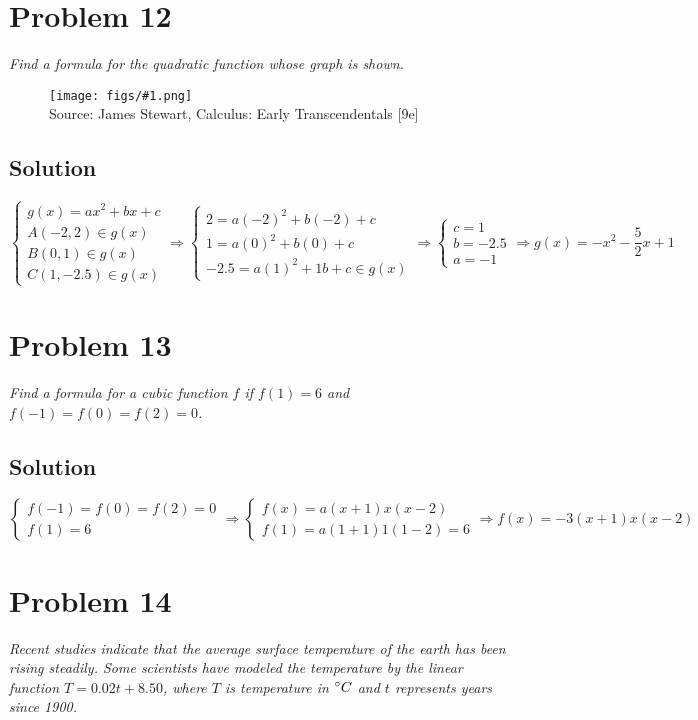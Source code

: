 \documentclass[11pt]{article}
\newcommand{\soln}{\subsection*}
\newcommand{\qn}{\textit}
\newcommand{\imagesource}[1]{{\footnotesize Source: #1}}
\newcommand{\imgqn}[1]{
	\begin{figure}[H]
		\centering
		\texttt{[image: figs/\#1.png]}\\
		\imagesource{James Stewart, Calculus: Early Transcendentals [9e]}
	\end{figure}
}
\begin{document}
\section*{Problem 12}

\qn{Find a formula for the quadratic function whose graph is shown.}

\imgqn{1.2.12}

\soln{Solution}
\begin{equation*}
	\begin{cases}
		g(x)=ax^2+bx+c \\
		A(-2,2) \in g(x) \\
		B(0,1) \in g(x) \\
		C(1,-2.5) \in g(x) 
	\end{cases}
	\Rightarrow
	\begin{cases}
		2=a(-2)^2+b(-2)+c \\
		1=a(0)^2+b(0)+c \\
		-2.5=a(1)^2+1b+c \in g(x) 
	\end{cases}
	\Rightarrow
	\begin{cases}
		c=1 \\
		b=-2.5 \\
		a=-1
	\end{cases}
	\Rightarrow
	g(x)=-x^2-\frac{5}{2}x+1
\end{equation*}

\section*{Problem 13}

\qn{Find a formula for a cubic function $f$ if $f(1)=6$ and $f(-1)=f(0)=f(2)=0$.}

\soln{Solution}
\begin{equation*}
	\begin{cases}
		f(-1)=f(0)=f(2)=0 \\
		f(1)=6
	\end{cases}
	\Rightarrow
	\begin{cases}
		f(x)=a(x+1)x(x-2) \\
		f(1)=a(1+1)1(1-2)=6
	\end{cases}
	\Rightarrow
	f(x)=-3(x+1)x(x-2)
\end{equation*}

\section*{Problem 14}

\qn{Recent studies indicate that the average surface temperature of the earth has been rising steadily. Some scientists have modeled the temperature by the linear function $T=0.02t+8.50$, where $T$ is temperature in $\degree C$ and $t$ represents years since 1900.}
\end{document}
